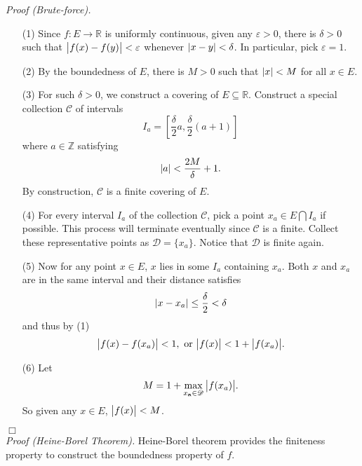 \documentclass{article}
\begin{document}
\emph{Proof (Brute-force).}
\begin{enumerate}
\item[(1)]
Since $f: E \to \mathbb{R}$ is uniformly continuous,
given any $\varepsilon > 0$, there is $\delta > 0$ such that
$\abs{f(x) - f(y)} < \varepsilon$ whenever $\abs{x - y} < \delta$.
In particular, pick $\varepsilon = 1$.
\item[(2)]
By the boundedness of $E$, there is $M > 0$ such that $\abs{x} < M$ for all $x \in E$.
\item[(3)]
For such $\delta > 0$, we construct a covering of $E \subseteq \mathbb{R}$.
Construct a special collection $\mathscr{C}$ of intervals
$$I_{a} =
  \left[ \frac{\delta}{2}a, \frac{\delta}{2}(a+1) \right]
$$
where $a \in \mathbb{Z}$ satisfying
$$\abs{a} < \frac{2M}{\delta} + 1.$$
By construction, $\mathscr{C}$ is a finite covering of $E$.
\item[(4)]
For every interval $I_a$ of the collection $\mathscr{C}$,
pick a point $x_a \in E \bigcap I_a$ if possible.
This process will terminate eventually since $\mathscr{C}$ is a finite.
Collect these representative points as $\mathscr{D} = \{ x_a \}$.
Notice that $\mathscr{D}$ is finite again.
\item[(5)]
Now for any point $x \in E$, $x$ lies in some $I_a$
containing $x_a$.
Both $x$ and $x_a$ are in the same interval and their distance satisfies
$$\abs{x - x_a}
\leq \frac{\delta}{2}
< \delta$$
and thus by (1)
$$\abs{f(x) - f(x_a)} < 1,
\text{ or }
\abs{f(x)} <  1 + \abs{f(x_a)}.$$
\item[(6)]
Let
$$M = 1 + \max_{x_\mathbf{a} \in \mathscr{D}} \abs{f(x_a)}.$$
So given any $x \in E$, $\abs{f(x)} < M$.
\end{enumerate}
$\Box$ \\

\emph{Proof (Heine-Borel Theorem).}
Heine-Borel theorem provides the finiteness property to construct
the boundedness property of $f$.
\end{document}
